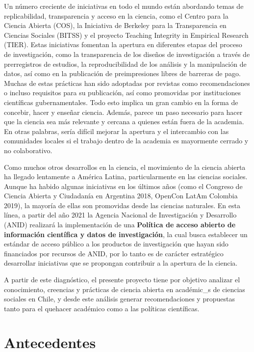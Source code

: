 \documentclass[
  letterpaper,
  DIV=11,
  numbers=noendperiod]{scrreprt}
\begin{document}
Un número creciente de iniciativas en todo el mundo están abordando
temas de replicabilidad, transparencia y acceso en la ciencia, como el
Centro para la Ciencia Abierta (COS), la Iniciativa de Berkeley para la
Transparencia en Ciencias Sociales (BITSS) y el proyecto Teaching
Integrity in Empirical Research (TIER). Estas iniciativas fomentan la
apertura en diferentes etapas del proceso de investigación, como la
transparencia de los diseños de investigación a través de prerregistros
de estudios, la reproducibilidad de los análisis y la manipulación de
datos, así como en la publicación de preimpresiones libres de barreras
de pago. Muchas de estas prácticas han sido adoptadas por revistas como
recomendaciones o incluso requisitos para su publicación, así como
promovidas por instituciones científicas gubernamentales. Todo esto
implica un gran cambio en la forma de concebir, hacer y enseñar ciencia.
Además, parece un paso necesario para hacer que la ciencia sea más
relevante y cercana a quienes están fuera de la academia. En otras
palabras, sería difícil mejorar la apertura y el intercambio con las
comunidades locales si el trabajo dentro de la academia es mayormente
cerrado y no colaborativo.

Como muchos otros desarrollos en la ciencia, el movimiento de la ciencia
abierta ha llegado lentamente a América Latina, particularmente en las
ciencias sociales. Aunque ha habido algunas iniciativas en los últimos
años (como el Congreso de Ciencia Abierta y Ciudadanía en Argentina
2018, OpenCon LatAm Colombia 2019), la mayoría de ellas son promovidas
desde las ciencias naturales. En esta línea, a partir del año 2021 la
Agencia Nacional de Investigación y Desarrollo (ANID) realizará la
implementación de una \textbf{Política de acceso abierto de información
científica y datos de investigación}, la cual busca establecer un
estándar de acceso público a los productos de investigación que hayan
sido financiados por recursos de ANID, por lo tanto es de carácter
estratégico desarrollar iniciativas que se propongan contribuir a la
apertura de la ciencia.

A partir de este diagnóstico, el presente proyecto tiene por objetivo
analizar el conocimiento, creencias y prácticas de ciencia abierta en
académic\_s de ciencias sociales en Chile, y desde este análisis generar
recomendaciones y propuestas tanto para el quehacer académico como a las
políticas científicas.


\chapter{Antecedentes}\label{antecedentes}
\end{document}
